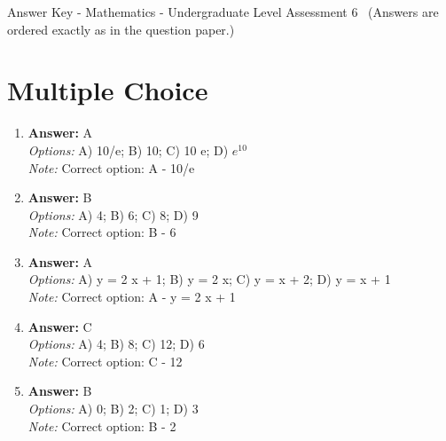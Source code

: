 \documentclass[12pt]{article}
\begin{document}
\begin{center}
Answer Key - Mathematics - Undergraduate Level Assessment 6 \
\small (Answers are ordered exactly as in the question paper.)
\end{center}

\section*{Multiple Choice}
\begin{enumerate}[label=\arabic*.]
\item \textbf{Answer:} A
\\ \textit{Options:} A) 10/e; B) 10; C) 10 e; D) $e^10$
\\ \textit{Note:} Correct option: A - 10/e
\item \textbf{Answer:} B
\\ \textit{Options:} A) 4; B) 6; C) 8; D) 9
\\ \textit{Note:} Correct option: B - 6
\item \textbf{Answer:} A
\\ \textit{Options:} A) y = 2 x + 1; B) y = 2 x; C) y = x + 2; D) y = x + 1
\\ \textit{Note:} Correct option: A - y = 2 x + 1
\item \textbf{Answer:} C
\\ \textit{Options:} A) 4; B) 8; C) 12; D) 6
\\ \textit{Note:} Correct option: C - 12
\item \textbf{Answer:} B
\\ \textit{Options:} A) 0; B) 2; C) 1; D) 3
\\ \textit{Note:} Correct option: B - 2
\end{enumerate}
\end{document}
